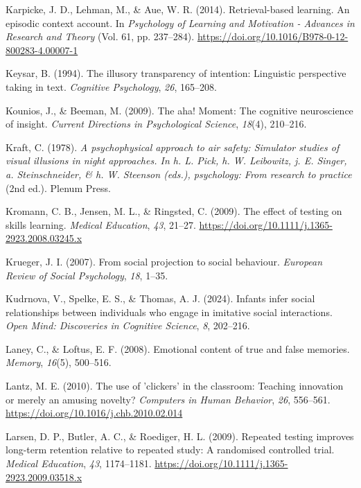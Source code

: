 \documentclass[
]{krantz}
\newlength{\cslhangindent}
\newenvironment{CSLReferences}[2] %
 {\begin{list}{}{%
  \setlength{\itemindent}{0pt}
  \setlength{\leftmargin}{0pt}
  \setlength{\parsep}{0pt}
  \ifodd #1
   \setlength{\leftmargin}{\cslhangindent}
   \setlength{\itemindent}{-1\cslhangindent}
  \fi
  \setlength{\itemsep}{#2\baselineskip}}}
 {\end{list}}
\begin{document}
\begin{CSLReferences}{1}{0}
Karpicke, J. D., Lehman, M., \& Aue, W. R. (2014). Retrieval-based learning. An episodic context account. In \emph{Psychology of Learning and Motivation - Advances in Research and Theory} (Vol. 61, pp. 237--284). \url{https://doi.org/10.1016/B978-0-12-800283-4.00007-1}

Keysar, B. (1994). The illusory transparency of intention: Linguistic perspective taking in text. \emph{Cognitive Psychology}, \emph{26}, 165--208.

Kounios, J., \& Beeman, M. (2009). The aha! Moment: The cognitive neuroscience of insight. \emph{Current Directions in Psychological Science}, \emph{18}(4), 210--216.

Kraft, C. (1978). \emph{A psychophysical approach to air safety: Simulator studies of visual illusions in night approaches. In h. L. Pick, h. W. Leibowitz, j. E. Singer, a. Steinschneider, \& h. W. Steenson (eds.), psychology: From research to practice} (2nd ed.). Plenum Press.

Kromann, C. B., Jensen, M. L., \& Ringsted, C. (2009). The effect of testing on skills learning. \emph{Medical Education}, \emph{43}, 21--27. \url{https://doi.org/10.1111/j.1365-2923.2008.03245.x}

Krueger, J. I. (2007). From social projection to social behaviour. \emph{European Review of Social Psychology}, \emph{18}, 1--35.

Kudrnova, V., Spelke, E. S., \& Thomas, A. J. (2024). Infants infer social relationships between individuals who engage in imitative social interactions. \emph{Open Mind: Discoveries in Cognitive Science}, \emph{8}, 202--216.

Laney, C., \& Loftus, E. F. (2008). Emotional content of true and false memories. \emph{Memory}, \emph{16}(5), 500--516.

Lantz, M. E. (2010). The use of 'clickers' in the classroom: Teaching innovation or merely an amusing novelty? \emph{Computers in Human Behavior}, \emph{26}, 556--561. \url{https://doi.org/10.1016/j.chb.2010.02.014}

Larsen, D. P., Butler, A. C., \& Roediger, H. L. (2009). Repeated testing improves long-term retention relative to repeated study: A randomised controlled trial. \emph{Medical Education}, \emph{43}, 1174--1181. \url{https://doi.org/10.1111/j.1365-2923.2009.03518.x}


\end{CSLReferences}
\end{document}
